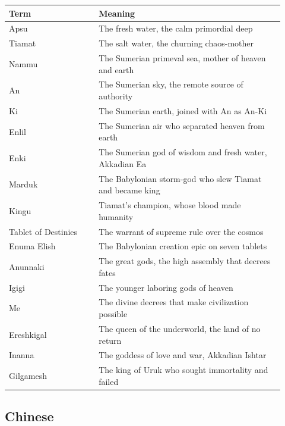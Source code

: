 \begin{longtable}{L{0.30\linewidth} L{0.62\linewidth}}
\toprule
\textbf{Term} & \textbf{Meaning} \\
\midrule
\endhead
Apsu & The fresh water, the calm primordial deep \\
Tiamat & The salt water, the churning chaos-mother \\
Nammu & The Sumerian primeval sea, mother of heaven and earth \\
An & The Sumerian sky, the remote source of authority \\
Ki & The Sumerian earth, joined with An as An-Ki \\
Enlil & The Sumerian air who separated heaven from earth \\
Enki & The Sumerian god of wisdom and fresh water, Akkadian Ea \\
Marduk & The Babylonian storm-god who slew Tiamat and became king \\
Kingu & Tiamat's champion, whose blood made humanity \\
Tablet of Destinies & The warrant of supreme rule over the cosmos \\
Enuma Elish & The Babylonian creation epic on seven tablets \\
Anunnaki & The great gods, the high assembly that decrees fates \\
Igigi & The younger laboring gods of heaven \\
Me & The divine decrees that make civilization possible \\
Ereshkigal & The queen of the underworld, the land of no return \\
Inanna & The goddess of love and war, Akkadian Ishtar \\
Gilgamesh & The king of Uruk who sought immortality and failed \\
\bottomrule
\end{longtable}

\subsection{Chinese}


